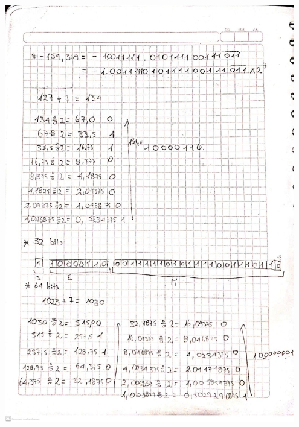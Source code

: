 \documentclass[12pt]{article}
\begin{document}
\vspace{0.5cm}

\begin{minipage}{0.95\textwidth}
    \raggedleft
    \includegraphics[width=0.95\textwidth]{inFiles/Figures/ej2.jpeg}
\end{minipage}

\vspace{0.5cm}
\end{document}
